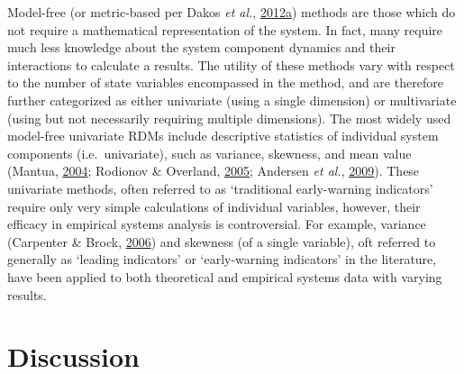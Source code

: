\documentclass[print]{nuthesis}
\begin{document}
Model-free (or metric-based per Dakos \emph{et al.}, \protect\hyperlink{ref-dakos2012methods}{2012}\protect\hyperlink{ref-dakos2012methods}{a}) methods are those which do not require a mathematical representation of the system. In fact, many require much less knowledge about the system component dynamics and their interactions to calculate a results. The utility of these methods vary with respect to the number of state variables encompassed in the method, and are therefore further categorized as either univariate (using a single dimension) or multivariate (using but not necessarily requiring multiple dimensions). The most widely used model-free univariate RDMs include descriptive statistics of individual system components (i.e.~univariate), such as variance, skewness, and mean value (Mantua, \protect\hyperlink{ref-mantua_methods_2004}{2004}; Rodionov \& Overland, \protect\hyperlink{ref-rodionov_application_2005}{2005}; Andersen \emph{et al.}, \protect\hyperlink{ref-andersen_ecological_2009}{2009}). These univariate methods, often referred to as `traditional early-warning indicators' require only very simple calculations of individual variables, however, their efficacy in empirical systems analysis is controversial. For example, variance (Carpenter \& Brock, \protect\hyperlink{ref-carpenter2006rising}{2006}) and skewness (of a single variable), oft referred to generally as `leading indicators' or `early-warning indicators' in the literature, have been applied to both theoretical and empirical systems data with varying results.

\hypertarget{discussion}{%
\section{Discussion}\label{discussion}}
\end{document}
